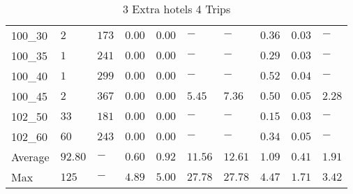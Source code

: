 \begin{center}
\begin{table}[]
\begin{tabular}{|lll|l|l|ll|lll|}
\hline
100\_30 & $2    $ & $173 $ & $\bm{0.00}$ & $\bm{0.00}$   & $-$     & $-$     & $0.36$ & $0.03$   & $-   $ \\
100\_35 & $1    $ & $241 $ & $\bm{0.00}$ & $\bm{0.00}$   & $-$     & $-$     & $0.29$ & $0.03$   & $-   $ \\
100\_40 & $1    $ & $299 $ & $\bm{0.00}$ & $\bm{0.00}$   & $-$     & $-$     & $0.52$ & $0.04$   & $-   $ \\
100\_45 & $2    $ & $367 $ & $\bm{0.00}$ & $\bm{0.00}$   & $5.45$  & $7.36$  & $0.50$ & $0.05$   & $2.28$ \\
\hline
102\_50 & $33   $ & $181 $ & $\bm{0.00}$ & $\bm{0.00}$   & $-$     & $-$     & $0.15$ & $0.03$   & $-   $ \\
102\_60 & $60   $ & $243 $ & $\bm{0.00}$ & $\bm{0.00}$   & $-$     & $-$     & $0.34$ & $0.05$   & $-   $ \\
\hline
Average & $92.80$ & $-   $ & $0.60$ & $0.92$   & $11.56$ & $12.61$ & $1.09$ & $0.41$   & $1.91$ \\
Max     & $125  $ & $-   $ & $4.89$ & $5.00$   & $27.78$ & $27.78$ & $4.47$ & $1.71$   & $3.42$ \\
\hline
\end{tabular}
\caption{3 Extra hotels 4 Trips}
\label{3-4}
\end{table}
\end{center}
